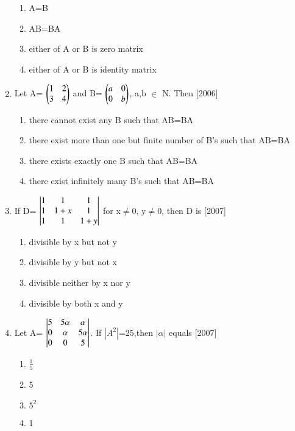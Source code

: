 \documentclass[journal,12pt,twocolumn]{IEEEtran}
\theoremstyle{remark}
\begin{document}
\begin{enumerate}
\begin{enumerate}[label=\alph*)]
    \item A=B
    \item AB=BA
    \item either of A or B is zero matrix
    \item either of A or B is identity matrix \\
\end{enumerate}
\item Let A= $\begin{pmatrix}
		1 & 2 \\
		3 & 4\end{pmatrix}$ and B= $\begin{pmatrix}
	                  a & 0 \\
			  0 & b\end{pmatrix}$, a,b $\in$ N. Then \hfill{[2006]} 
\begin{enumerate}[label=\alph*)]
    \item there cannot exist any B such that AB=BA
    \item there exist more than one but finite number of B's such that AB=BA
    \item there exists exactly one B such that AB=BA
    \item there exist infinitely many B's such that AB=BA \\
\end{enumerate}
\item If D= $\begin{vmatrix}
		1 & 1 & 1 \\
		1 & 1+x & 1 \\
		1 & 1 & 1+y\end{vmatrix}$ for x$\neq$0, y$\neq$0, then D is \hfill{[2007]} 
\begin{enumerate}[label=\alph*)]
	\item divisible by x but not y
	\item divisible by y but not x
	\item divisible neither by x nor y
	\item divisible by both x and y \\
\end{enumerate}
\item Let A= $\begin{vmatrix}
		5 & 5\alpha & \alpha \\
		0 & \alpha & 5\alpha \\
		0 & 0 & 5\end{vmatrix}$. If $|A^2|$=25,then $|\alpha|$ equals \hfill{[2007]}
\begin{enumerate}[label=\alph*)]
	\item $\frac{1}{5}$
        \item 5
        \item $5^2$
        \item 1 \\

\end{enumerate}
\end{enumerate}
\end{document}

